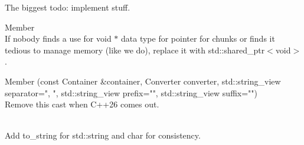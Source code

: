 \begin{DoxyRefList}
\label{todo__todo000008}%
%
The biggest todo\+: implement stuff.  
\item[Member \doxylink{structauspicious__library_1_1fu_1_1sd__chunk_ace08b3afc60b72859a0ceeb093161ae8}{auspicious\+\_\+library\+::fu\+::sd\+\_\+chunk\+::data} ]\hfill \\
\label{todo__todo000009}%
%
If nobody finds a use for {\ttfamily void \texorpdfstring{$\ast$}{*}} data type for pointer for chunks or finds it tedious to manage memory (like we do), replace it with {\ttfamily std\+::shared\+\_\+ptr$<$void$>$} .  
\item[Member \doxylink{namespaceauspicious__library_1_1sm_af4d2d6d72a9c765f4fe02a0462d35bcf}{auspicious\+\_\+library\+::sm\+::to\+\_\+string} (const Container \&container, Converter converter, std\+::string\+\_\+view separator="{}, "{}, std\+::string\+\_\+view prefix="{}"{}, std\+::string\+\_\+view suffix="{}"{})]\hfill \\
\label{todo__todo000010}%
%
Remove this cast when C++26 comes out.  
\item[Member \doxylink{namespaceauspicious__library_1_1sm_a557e590ecf315060dbbe49015d5e90fb}{auspicious\+\_\+library\+::sm\+::word\+\_\+wrap} (std\+::string\+\_\+view string, std\+::size\+\_\+t width, bool force=false, std\+::string\+\_\+view delims="{} \textbackslash{}\textbackslash{}t\textbackslash{}\textbackslash{}r\textbackslash{}\textbackslash{}n\textbackslash{}\textbackslash{}f\textbackslash{}\textbackslash{}v\textbackslash{}\textbackslash{}b"{})]\hfill \\
\label{todo__todo000011}%
%
Add to\+\_\+string for std\+::string and char for consistency. 
\end{DoxyRefList}